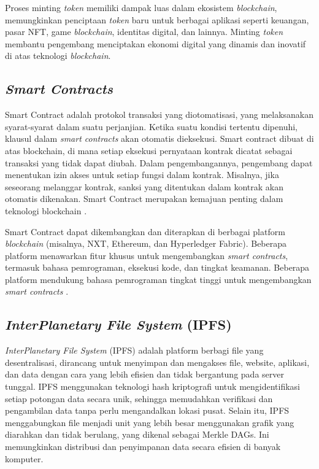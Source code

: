 Proses minting \emph{token} memiliki dampak luas dalam ekosistem \emph{blockchain}, memungkinkan penciptaan \emph{token} baru untuk berbagai aplikasi seperti keuangan, pasar NFT, game \emph{blockchain}, identitas digital, dan lainnya. Minting \emph{token} membantu pengembang menciptakan ekonomi digital yang dinamis dan inovatif di atas teknologi \emph{blockchain}. 

\subsection{\emph{Smart Contracts}}
Smart Contract adalah protokol transaksi yang diotomatisasi, yang melaksanakan syarat-syarat dalam suatu perjanjian. Ketika suatu kondisi tertentu dipenuhi, klausul dalam \emph{smart contracts} akan otomatis dieksekusi. Smart contract dibuat di atas blockchain, di mana setiap eksekusi pernyataan kontrak dicatat sebagai transaksi yang tidak dapat diubah. Dalam pengembangannya, pengembang dapat menentukan izin akses untuk setiap fungsi dalam kontrak. Misalnya, jika seseorang melanggar kontrak, sanksi yang ditentukan dalam kontrak akan otomatis dikenakan. Smart Contract merupakan kemajuan penting dalam teknologi blockchain \parencite{Zheng2020}.

Smart Contract dapat dikembangkan dan diterapkan di berbagai platform \emph{blockchain} (misalnya, NXT, Ethereum, dan Hyperledger Fabric). Beberapa platform menawarkan fitur khusus untuk mengembangkan \emph{smart contracts}, termasuk bahasa pemrograman, eksekusi kode, dan tingkat keamanan. Beberapa platform mendukung bahasa pemrograman tingkat tinggi untuk mengembangkan \emph{smart contracts} \parencite{Khan2021}.

\subsection{\emph{InterPlanetary File System} (IPFS)}
\emph{InterPlanetary File System } (IPFS) adalah platform berbagi file yang desentralisasi, dirancang untuk menyimpan dan mengakses file, website, aplikasi, dan data dengan cara yang lebih efisien dan tidak bergantung pada server tunggal. IPFS menggunakan teknologi hash kriptografi untuk mengidentifikasi setiap potongan data secara unik, sehingga memudahkan verifikasi dan pengambilan data tanpa perlu mengandalkan lokasi pusat. Selain itu, IPFS menggabungkan file menjadi unit yang lebih besar menggunakan grafik yang diarahkan dan tidak berulang, yang dikenal sebagai Merkle DAGs. Ini memungkinkan distribusi dan penyimpanan data secara efisien di banyak komputer.

